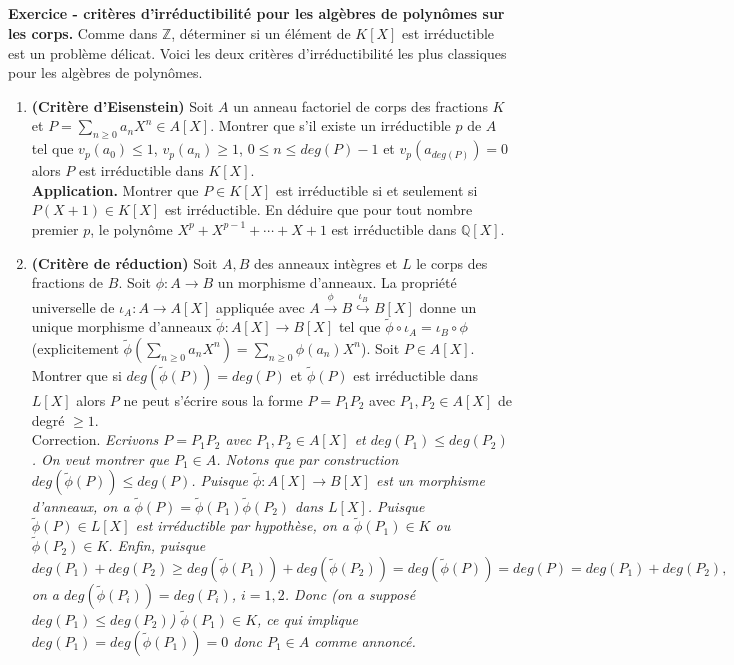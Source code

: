 \documentclass[a4paper, oneside, 12pt]{book}
\theoremstyle{definition} %
\newcommand{\Q}{\mathbb{Q}}
\newcommand{\Z}{\mathbb{Z}}
\begin{document}
 \subsection{}\textbf{Exercice - critères d'irréductibilité pour les algèbres de polynômes sur les corps.} Comme dans $\Z$, déterminer  si un élément de $K[X]$ est irréductible est un problème délicat. Voici les deux critères d'irréductibilité les plus classiques pour les algèbres de polynômes.\\
  \begin{enumerate}[leftmargin=* ,parsep=0cm,itemsep=0cm,topsep=0cm] 
  \item \textbf{(Critère d'Eisenstein)} Soit $A$ un anneau factoriel de corps des fractions $ K$ et $P=\sum_{n\geq 0} a_nX^n\in A[X]$. Montrer que s'il existe un irréductible $p$ de $A$ tel que $v_p(a_0)\leq 1$, $v_p(a_n)\geq 1$, $0\leq n\leq deg(P)-1$ et $v_p(a_{deg(P)})=0$ alors $P$ est irréductible dans $K[X]$.\\
  
  \textbf{Application.} Montrer que $P\in K[X]$ est irréductible si et seulement si $P(X+1)\in K[X]$ est irréductible. En déduire que pour tout nombre premier $p$, le polynôme $X^p+X^{p-1}+\cdots+X+1$ est irréductible dans $\Q[X]$. \\
  \item \textbf{(Critère de réduction)} Soit $A,B$ des anneaux intègres et $L$ le corps des fractions de $B$. Soit $\phi:A\rightarrow B$ un morphisme d'anneaux. La propriété universelle de $\iota_A:A\rightarrow A[X]$ appliquée avec $A\stackrel{\phi}{\rightarrow}B\stackrel{\iota_B}{\hookrightarrow} B[X]$ donne un unique morphisme d'anneaux $\tilde{\phi}:A[X]\rightarrow B[X]$ tel que $\tilde{\phi}\circ \iota_A=\iota_B\circ\phi$ (explicitement $\tilde{\phi}(\sum_{n\geq 0}a_nX^n)=\sum_{n\geq 0}\phi(a_n)X^n$). Soit $P\in A[X]$. Montrer  que si $deg(\tilde{\phi}(P))=deg(P)$ et $\tilde{\phi}(P)$ est irréductible dans $L[X]$ alors $P$ ne peut s'écrire sous la forme $P=P_1P_2$ avec $P_1,P_2\in A[X]$ de degré $\geq 1$.\\
  
  
   Correction. \textit{Ecrivons  $P=P_1P_2$ avec   $P_1,P_2\in A[X]$ et $deg(P_1)\leq deg(P_2)$. On veut montrer que $P_1\in A$. Notons que par construction $deg(\tilde{\phi}(P))\leq deg(P)$. Puisque $\tilde{\phi}:A[X]\rightarrow B[X]$ est un morphisme d'anneaux, on a $\tilde{\phi}(P)=\tilde{\phi}(P_1)\tilde{\phi}(P_2)$ dans $L[X]$. Puisque  $\tilde{\phi}(P)\in L[X]$ est irréductible par hypothèse, on a $\tilde{\phi}(P_1)\in K$ ou $\tilde{\phi}(P_2)\in K$. Enfin, puisque $$deg(P_1)+deg(P_2)\geq deg(\tilde{\phi}(P_1))+deg(\tilde{\phi}(P_2))=deg(\tilde{\phi}(P))=deg(P)=deg(P_1)+deg(P_2),$$ 
  on a $deg(\tilde{\phi}(P_i))=deg(P_i)$, $i=1,2$. Donc (on a supposé $deg(P_1)\leq deg(P_2)$) $\tilde{\phi}(P_1)\in K$, ce qui implique $deg(P_1)=deg(\tilde{\phi}(P_1))=0$ donc $P_1\in A$ comme annoncé.}\\
  

\end{enumerate}
\end{document}

